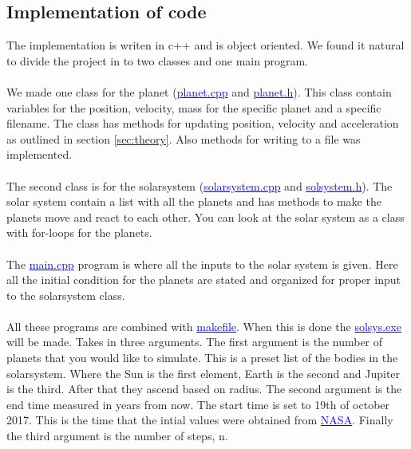 \subsection{Implementation of code}

The implementation is writen in c++ and is object oriented. We found it natural to divide the project in to two classes and one main program. 
\\
\\
We made one class for the planet (\href{https://github.com/erikfsk/Project-3/blob/master/Project3/planet.cpp}{\textcolor{blue}{planet.cpp}} and \href{https://github.com/erikfsk/Project-3/blob/master/Project3/planet.h}{\textcolor{blue}{planet.h}}). This class contain variables for the position, velocity, mass for the specific planet and a specific filename. The class has methods for updating position, velocity and acceleration as outlined in section \ref{sec:theory}. Also methods for writing to a file was implemented. 
\\
\\
The second class is for the solarsystem (\href{https://github.com/erikfsk/Project-3/blob/master/Project3/solarsystem.cpp}{\textcolor{blue}{solarsystem.cpp}} and \href{https://github.com/erikfsk/Project-3/blob/master/Project3/solarsystem.h}{\textcolor{blue}{solsystem.h}}). The solar system contain a list with all the planets and has methods to make the planets move and react to each other. You can look at the solar system as a class with for-loops for the planets. 
\\
\\
The \href{https://github.com/erikfsk/Project-3/blob/master/Project3/main.cpp}{\textcolor{blue}{main.cpp}} program is where all the inputs to the solar system is given. Here all the initial condition for the planets are stated and organized for proper input to the solarsystem class.
\\
\\
All these programs are combined with \href{https://github.com/erikfsk/Project-3/blob/master/Project3/makefile}{\textcolor{blue}{makefile}}. When this is done the \href{https://github.com/erikfsk/Project-3/blob/master/Project3/solsys.exe}{\textcolor{blue}{solsys.exe}} will be made. Takes in three arguments. The first argument is the number of planets that you would like to simulate. This is a preset list of the bodies in the solarsystem. Where the Sun is the first element, Earth is the second and Jupiter is the third. After that they ascend based on radius. The second argument is the end time measured in years from now. The start time is set to 19th of october 2017. This is the time that the intial values were obtained from \href{https://ssd.jpl.nasa.gov/horizons.cgi#top}{\textcolor{blue}{NASA}}. Finally the third argument is the number of steps, n. 
